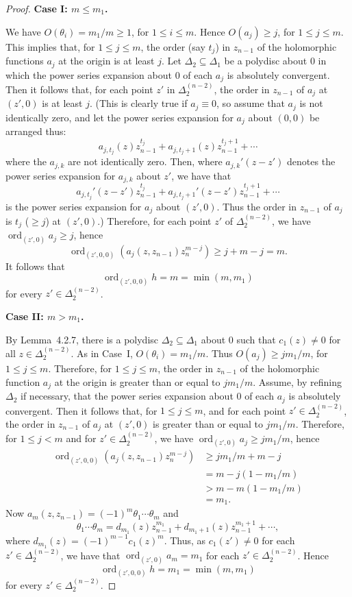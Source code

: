 \documentclass[11pt]{article}
\theoremstyle{plain}
\theoremstyle{definition}
\DeclareMathOperator{\ord}{ord}
\begin{document}
\begin{proof}
\medskip
\noindent \textbf{Case I: $m \le m_1$.}
\medskip

We have $O(\theta_i) = m_1 / m \ge 1$, for $1 \le i \le m$. Hence
$O(a_j) \ge j$, for $1 \le j \le m$. This implies that, for
$1 \le j \le m$, the order (say $t_j$) in $z_{n-1}$ of the
holomorphic functions $a_j$ at the origin is at least $j$. Let
$\Delta_2 \subseteq \Delta_1$ be a polydisc about $0$ in which the
power series expansion about $0$ of each $a_j$ is absolutely
convergent. Then it follows that, for each point $z'$ in
$\Delta_2^{(n-2)}$, the order in $z_{n-1}$ of $a_j$ at $(z', 0)$ is
at least $j$. (This is clearly true if $a_j \equiv 0$, so assume
that $a_j$ is not identically zero, and let the power series
expansion for $a_j$ about $(0, 0)$ be arranged thus:
\[
a_{j, t_j}(z) z_{n-1}^{t_j} + a_{j, t_j + 1}(z) z_{n-1}^{t_j + 1} + \cdots
\]
where the $a_{j, k}$ are not identically zero. Then, where
$a_{j, k}'(z - z')$ denotes the power series expansion for $a_{j, k}$
about $z'$, we have that
\[
a_{j, t_j}'(z - z') z_{n-1}^{t_j}
+ a_{j, t_j + 1}'(z - z') z_{n-1}^{t_j + 1} + \cdots
\]
is the power series expansion for $a_j$ about $(z', 0)$. Thus the
order in $z_{n-1}$ of $a_j$ is $t_j$ ($\ge j$) at $(z', 0)$.)
Therefore, for each point $z'$ of $\Delta_2^{(n-2)}$, we have
$\ord_{(z', 0)} a_j \ge j$, hence
\[
\ord_{(z', 0, 0)} (a_j(z, z_{n-1}) z_n^{m-j}) \ge j + m - j = m.
\]
It follows that
\[
\ord_{(z', 0, 0)} h = m = \min(m, m_1)
\]
for every $z' \in \Delta_2^{(n-2)}$.

\medskip
\noindent \textbf{Case II: $m > m_1$.}
\medskip

By Lemma~4.2.7, there is a polydisc $\Delta_2 \subseteq \Delta_1$
about $0$ such that $c_1(z) \ne 0$ for all
$z \in \Delta_2^{(n-2)}$. As in Case~I, $O(\theta_i) = m_1 / m$.
Thus $O(a_j) \ge j m_1 / m$, for $1 \le j \le m$. Therefore, for
$1 \le j \le m$, the order in $z_{n-1}$ of the holomorphic function
$a_j$ at the origin is greater than or equal to $j m_1 / m$. Assume,
by refining $\Delta_2$ if necessary, that the power series expansion
about $0$ of each $a_j$ is absolutely convergent. Then it follows
that, for $1 \le j \le m$, and for each point $z' \in
\Delta_2^{(n-2)}$, the order in $z_{n-1}$ of $a_j$ at $(z', 0)$ is
greater than or equal to $j m_1 / m$. Therefore, for $1 \le j < m$
and for $z' \in \Delta_2^{(n-2)}$, we have
$\ord_{(z', 0)} a_j \ge j m_1 / m$, hence
\[
\begin{aligned}
\ord_{(z', 0, 0)} (a_j(z, z_{n-1}) z_n^{m-j})
&\ge j m_1 / m + m - j \\
&= m - j (1 - m_1 / m) \\
&> m - m (1 - m_1 / m) \\
&= m_1.
\end{aligned}
\]
Now $a_m(z, z_{n-1}) = (-1)^m \theta_1 \cdots \theta_m$ and
\[
\theta_1 \cdots \theta_m = d_{m_1}(z) z_{n-1}^{m_1}
+ d_{m_1 + 1}(z) z_{n-1}^{m_1 + 1} + \cdots,
\]
where $d_{m_1}(z) = (-1)^{m-1} c_1(z)^m$. Thus, as
$c_1(z') \ne 0$ for each $z' \in \Delta_2^{(n-2)}$, we have that
$\ord_{(z', 0)} a_m = m_1$ for each $z' \in \Delta_2^{(n-2)}$.
Hence
\[
\ord_{(z', 0, 0)} h = m_1 = \min(m, m_1)
\]
for every $z' \in \Delta_2^{(n-2)}$.
\end{proof}
\end{document}
